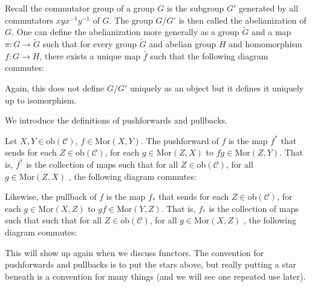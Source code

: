 \documentclass[12pt,reqno]{amsart}
\numberwithin{theorem}{section}
\theoremstyle{definition}
\theoremstyle{remark}
\numberwithin{equation}{section}
\newcommand{\cC}{\mathcal{C}}
\theoremstyle{definition}
\newcommand{\ob}{\mathrm{ob}}
\newcommand{\Mor}{\mathrm{Mor}}
\begin{document}
\begin{example}
    Recall the commutator group of a group $G$ is the subgroup $G'$ generated by all commutators $xyx^{-1}y^{-1}$ of $G$. The group $G/G'$ is then called the abelianization of $G$. One can define the abelianization more generally as a group $\tilde G$ and a map $\pi: G \rightarrow \tilde G$ such that for every group $\tilde G$ and abelian group $H$ and homomorphism $f:G\rightarrow H$, there exists a unique map $\bar f$ such that the following diagram commutes:
    \begin{center}
    \end{center}
    Again, this does not define $G/G'$ uniquely as an object but it defines it uniquely up to isomorphism. 
\end{example}
We introduce the definitions of pushforwards and pullbacks.
\begin{definition}
    Let $X,Y\in \ob(\cC)$, $f\in \Mor(X,Y)$. The pushforward of $f$ is the map $f^*$ that sends for each $Z \in \ob(\cC)$, for each $g \in \Mor(Z,X)$ to $fg \in \Mor(Z,Y)$. That is, $f^*$ is the collection of maps such that for all $Z \in \ob(\cC)$, for all $g \in \Mor(Z,X)$ , the following diagram commutes:
    \begin{center}
    \end{center}
    Likewise, the pullback of $f$ is the map $f_*$ that sends for each $Z \in \ob(\cC)$, for each $g \in \Mor(X,Z)$ to $gf \in \Mor(Y,Z)$. That is, $f_*$ is the collection of maps such that 
    such that for all $Z \in \ob(\cC)$, for all $g \in \Mor(X,Z)$ , the following diagram commutes:
    \begin{center}
    \end{center}
\end{definition}
This will show up again when we discuss functors. The convention for pushforwards and pullbacks is to put the stars above, but really putting a star beneath is a convention for many things (and we will see one repeated use later). 
\end{document}
